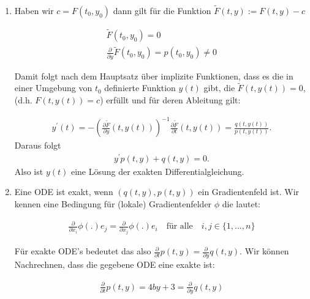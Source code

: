 \begin{solution}
  \phantom{}
\leavevmode \\
\begin{enumerate}[label = \textbf{\alph*)}]
\item
Haben wir $c = F(t_0 , y_0 )$ dann gilt für die Funktion $\widetilde{F}(t,y) := F(t,y) - c$

\begin{align*}
  \widetilde{F}(t_0 , y_0 ) = 0 \\
  \frac{\partial}{\partial y}\widetilde{F}(t_0 , y_0 ) = p(t_0 , y_0 ) \neq 0
\end{align*}

Damit folgt nach dem Hauptsatz über implizite
Funktionen, dass es die in einer Umgebung von $t_0$ definierte Funktion $y(t)$ gibt, die
$\widetilde{F}(t,y(t)) = 0$, (d.h. $F(t,y(t))=c$) erfüllt und für
deren Ableitung gilt:

\begin{align*}
  y^{\prime}(t) = -\left(\frac{\partial \widetilde{F}}{\partial y}(t,y(t))\right)^{-1}
  \frac{\partial \widetilde{F}}{\partial t}(t,y(t)) = \frac{q(t,y(t))}{p(t,y(t))}.
\end{align*}
Daraus folgt
\begin{align*}
  y^{\prime}p(t,y) + q(t,y) = 0.
\end{align*}
Also ist $y(t)$ eine Lösung der exakten Differentialgleichung.
\item
Eine ODE ist exakt, wenn $(q(t,y), p(t,y))$ ein Gradientenfeld ist. Wir kennen eine
Bedingung für (lokale) Gradientenfelder $\phi$ die lautet:

\begin{align*}
  \frac{\partial}{\partial x_i} \phi(.) e_j = \frac{\partial}{\partial x_j} \phi(.) e_i
  \quad \text{für alle} \quad i, j \in \{1,...,n\}
\end{align*}

Für exakte ODE's bedeutet  das also $\frac{\partial}{\partial t} p(t,y) =
\frac{\partial}{\partial y} q(t,y)$.
Wir können Nachrechnen, dass die gegebene ODE eine exakte ist:

\begin{align*}
  \frac{\partial}{\partial t} p(t,y) = 4by + 3 =
  \frac{\partial}{\partial y} q(t,y)
\end{align*}


\end{enumerate}
\end{solution}
